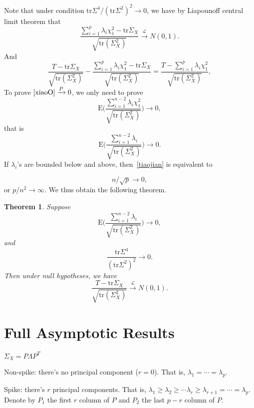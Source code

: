 \documentclass[review]{elsarticle}
\theoremstyle{plain}
\newtheorem{theorem}{\quad\quad Theorem}
\theoremstyle{definition}
\theoremstyle{remark}
\begin{document}
Note that under condition \({\textrm{tr}\Sigma^4}/{{(\textrm{tr}\Sigma^2)}^2} \to 0\), we have by Liapounoff central limit theorem that
\[
    \frac{\sum_{i=1}^p \lambda_i \chi^2_1-\textrm{tr}\Sigma_X}{
        \sqrt{\textrm{tr}(\Sigma_X^2)}
    }\xrightarrow{\mathcal{L}}N(0,1).
    \]
And 
    \begin{equation}\label{xiaoO}
    \frac{T-\textrm{tr}\Sigma_X}{\sqrt{\textrm{tr}(\Sigma_X^2)}}-
    \frac{\sum_{i=1}^p \lambda_i \chi^2_1-\textrm{tr}\Sigma_X}{\sqrt{\textrm{tr}(\Sigma_X^2)}}
    =\frac{T-\sum_{i=1}^p \lambda_i \chi^2_1}{\sqrt{\textrm{tr}(\Sigma_X^2)}},
    \end{equation}
    To prove $\eqref{xiaoO}\xrightarrow{P}0$, we only need to prove
\[
    \textrm{E}\Big(\frac{\sum_{i=1}^{n-2} \lambda_i \chi^2_1}{
        \sqrt{\textrm{tr}(\Sigma_X^2)}}\Big)\to 0,
    \]
that is
    \begin{equation}\label{tiaojian}
    \textrm{E}\Big(\frac{\sum_{i=1}^{n-2} \lambda_i}{\sqrt{\textrm{tr}(\Sigma_X^2)}}\Big)\to 0.
    \end{equation}
If $\lambda_i$'s are bounded below and above, then~\eqref{tiaojian} is equivalent to

    \begin{equation}\label{npOrder}
        n/\sqrt{p}\to 0,
    \end{equation}
    or $p/n^2 \to \infty$. We thus obtain the following theorem.


\begin{theorem}
    Suppose
    \[
    \textrm{E}\Big(\frac{\sum_{i=1}^{n-2} \lambda_i}{\sqrt{\textrm{tr}(\Sigma_X^2)}}\Big)\to 0,
        \] 
    and
    \[
        \frac{\textrm{tr}\Sigma^4}{{(\textrm{tr}\Sigma^2)}^2} \to 0.
        \]
    Then under null hypotheses, we have
    \[
    \frac{T-\textrm{tr}\Sigma_X}{
        \sqrt{\textrm{tr}(\Sigma_X^2)}
    }\xrightarrow{\mathcal{L}}N(0,1).
        \]
\end{theorem}
\section{Full Asymptotic Results}

$\Sigma_X=P\Lambda P^T$

Non-spike: there's no principal component ($r=0$). That is, $\lambda_1=\cdots = \lambda_p$.

Spike: there's $r$ principal components. That is, $\lambda_1\geq \lambda_2\geq \cdots \lambda_r\geq \lambda_{r+1}=\cdots =\lambda_p$. Denote by $P_1$ the first $r$ column of $P$ and $P_2$ the last $p-r$ column of $P$.
\end{document}
